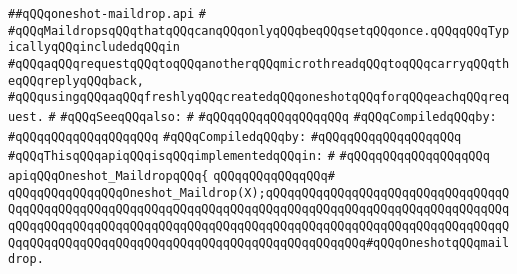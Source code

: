 \label{src/lib/src/lib/thread-kit/src/core-thread-kit/oneshot-maildrop.api}
\verb|##qQQqoneshot-maildrop.api|\newline
\verb|#|\newline
\verb|#qQQqMaildropsqQQqthatqQQqcanqQQqonlyqQQqbeqQQqsetqQQqonce.qQQqqQQqTypicallyqQQqincludedqQQqin|\newline
\verb|#qQQqaqQQqrequestqQQqtoqQQqanotherqQQqmicrothreadqQQqtoqQQqcarryqQQqtheqQQqreplyqQQqback,|\newline
\verb|#qQQqusingqQQqaqQQqfreshlyqQQqcreatedqQQqoneshotqQQqforqQQqeachqQQqrequest.|\newline
\verb|#|\newline
\verb|#qQQqSeeqQQqalso:|\newline
\verb|#|\newline
\verb|#qQQqqQQqqQQqqQQqqQQq|\newline
\newline
\verb|#qQQqCompiledqQQqby:|\newline
\verb|#qQQqqQQqqQQqqQQqqQQq|\newline
\newline
\newline
\verb|#qQQqCompiledqQQqby:|\newline
\verb|#qQQqqQQqqQQqqQQqqQQq|\newline
\newline
\newline
\newline
\verb|#qQQqThisqQQqapiqQQqisqQQqimplementedqQQqin:|\newline
\verb|#|\newline
\verb|#qQQqqQQqqQQqqQQqqQQq|\newline
\newline
\verb|apiqQQqOneshot_MaildropqQQq{|\newline
\verb|qQQqqQQqqQQqqQQq#|\newline
\verb|qQQqqQQqqQQqqQQqOneshot_Maildrop(X);qQQqqQQqqQQqqQQqqQQqqQQqqQQqqQQqqQQqqQQqqQQqqQQqqQQqqQQqqQQqqQQqqQQqqQQqqQQqqQQqqQQqqQQqqQQqqQQqqQQqqQQqqQQqqQQqqQQqqQQqqQQqqQQqqQQqqQQqqQQqqQQqqQQqqQQqqQQqqQQqqQQqqQQqqQQqqQQqqQQqqQQqqQQqqQQqqQQqqQQqqQQqqQQqqQQqqQQqqQQqqQQq#qQQqOneshotqQQqmaildrop.|\newline
